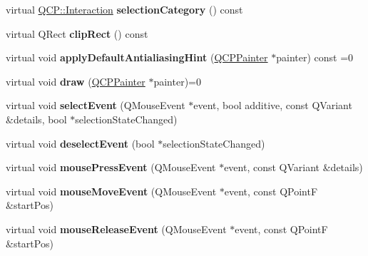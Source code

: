 \begin{DoxyCompactItemize}
virtual \hyperlink{namespace_q_c_p_a2ad6bb6281c7c2d593d4277b44c2b037}{Q\+C\+P\+::\+Interaction} {\bfseries selection\+Category} () const
\item 
\mbox{\label{class_q_c_p_layerable_afe2a5078cf08b63f94a1d614f6380bc2}} 
virtual Q\+Rect {\bfseries clip\+Rect} () const
\item 
\mbox{\label{class_q_c_p_layerable_a1168944abbf9fa6731b0f4a2d0d67e8b}} 
virtual void {\bfseries apply\+Default\+Antialiasing\+Hint} (\hyperlink{class_q_c_p_painter}{Q\+C\+P\+Painter} $\ast$painter) const =0
\item 
\mbox{\label{class_q_c_p_layerable_adf62b4bac3ca934db80290792fc897e1}} 
virtual void {\bfseries draw} (\hyperlink{class_q_c_p_painter}{Q\+C\+P\+Painter} $\ast$painter)=0
\item 
\mbox{\label{class_q_c_p_layerable_a0ff16be287fca7c237070ed821e921db}} 
virtual void {\bfseries select\+Event} (Q\+Mouse\+Event $\ast$event, bool additive, const Q\+Variant \&details, bool $\ast$selection\+State\+Changed)
\item 
\mbox{\label{class_q_c_p_layerable_a86e627b6b03aea7202b65328bd150936}} 
virtual void {\bfseries deselect\+Event} (bool $\ast$selection\+State\+Changed)
\item 
\mbox{\label{class_q_c_p_layerable_a0295d5eb32e429bd1a9845e4fe889a93}} 
virtual void {\bfseries mouse\+Press\+Event} (Q\+Mouse\+Event $\ast$event, const Q\+Variant \&details)
\item 
\mbox{\label{class_q_c_p_layerable_afd4d5359773fc5f479bcd6c5bb7d9711}} 
virtual void {\bfseries mouse\+Move\+Event} (Q\+Mouse\+Event $\ast$event, const Q\+PointF \&start\+Pos)
\item 
\mbox{\label{class_q_c_p_layerable_a2f1b906a2cf286bc492b4600c369b28c}} 
virtual void {\bfseries mouse\+Release\+Event} (Q\+Mouse\+Event $\ast$event, const Q\+PointF \&start\+Pos)
\item 
\mbox{\label{class_q_c_p_layerable_afedfd6f29df0297deba2812f4497810c}} 

\end{DoxyCompactItemize}
